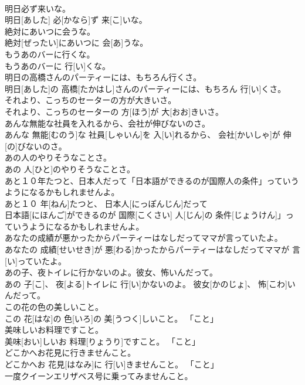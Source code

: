 \documentclass[8pt]{extreport}
\begin{document}
\begin{CJK}{UTF8}{min}
\\	明日必ず来いな。	
\\	明日[あした] 必[かなら]ず 来[こ]いな。	
\\	絶対にあいつに会うな。	
\\	絶対[ぜったい]にあいつに 会[あ]うな。	
\\	もうあのバーに行くな。	
\\	もうあのバーに 行[い]くな。	
\\	明日の高橋さんのパーティーには、もちろん行くさ。	
\\	明日[あした]の 高橋[たかはし]さんのパーティーには、もちろん 行[い]くさ。	
\\	それより、こっちのセーターの方が大きいさ。	
\\	それより、こっちのセーターの 方[ほう]が 大[おお]きいさ。	
\\	あんな無能な社員を入れるから、会社が伸びないのさ。	
\\	あんな 無能[むのう]な 社員[しゃいん]を 入[い]れるから、 会社[かいしゃ]が 伸[の]びないのさ。	
\\	あの人のやりそうなことさ。	
\\	あの 人[ひと]のやりそうなことさ。	
\\	あと１０年たつと、日本人だって「日本語ができるのが国際人の条件」っていうようになるかもしれませんよ。	
\\	あと１０ 年[ねん]たつと、 日本人[にっぽんじん]だって
\\	日本語[にほんご]ができるのが 国際[こくさい] 人[じん]の 条件[じょうけん]」っていうようになるかもしれませんよ。	
\\	あなたの成績が悪かったからパーティーはなしだってママが言っていたよ。	
\\	あなたの 成績[せいせき]が 悪[わる]かったからパーティーはなしだってママが 言[い]っていたよ。	
\\	あの子、夜トイレに行かないのよ。彼女、怖いんだって。	
\\	あの 子[こ]、 夜[よる]トイレに 行[い]かないのよ。 彼女[かのじょ]、 怖[こわ]いんだって。	
\\	この花の色の美しいこと。	
\\	この 花[はな]の 色[いろ]の 美[うつく]しいこと。	「こと」
\\	美味しいお料理ですこと。	
\\	美味[おい]しいお 料理[りょうり]ですこと。	「こと」
\\	どこかへお花見に行きませんこと。	
\\	どこかへお 花見[はなみ]に 行[い]きませんこと。	「こと」
\\	一度クイーンエリザベス号に乗ってみませんこと。	

\end{CJK}
\end{document}
